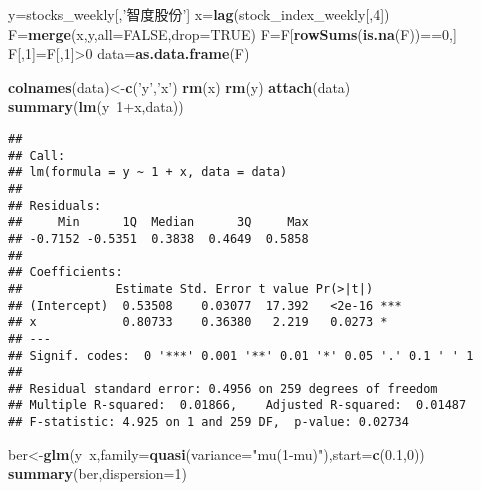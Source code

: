 \documentclass[]{ctexart}
\newenvironment{Shaded}{\begin{snugshade}}{\end{snugshade}}
\newcommand{\KeywordTok}[1]{\textcolor[rgb]{0.13,0.29,0.53}{\textbf{{#1}}}}
\newcommand{\DataTypeTok}[1]{\textcolor[rgb]{0.13,0.29,0.53}{{#1}}}
\newcommand{\DecValTok}[1]{\textcolor[rgb]{0.00,0.00,0.81}{{#1}}}
\newcommand{\FloatTok}[1]{\textcolor[rgb]{0.00,0.00,0.81}{{#1}}}
\newcommand{\StringTok}[1]{\textcolor[rgb]{0.31,0.60,0.02}{{#1}}}
\newcommand{\OtherTok}[1]{\textcolor[rgb]{0.56,0.35,0.01}{{#1}}}
\newcommand{\NormalTok}[1]{{#1}}
\begin{document}
\begin{Shaded}
\begin{Highlighting}[]
\NormalTok{y=stocks_weekly[,}\StringTok{'智度股份'}\NormalTok{]}
\NormalTok{x=}\KeywordTok{lag}\NormalTok{(stock_index_weekly[,}\DecValTok{4}\NormalTok{])}
\NormalTok{F=}\KeywordTok{merge}\NormalTok{(x,y,}\DataTypeTok{all=}\OtherTok{FALSE}\NormalTok{,}\DataTypeTok{drop=}\OtherTok{TRUE}\NormalTok{)}
\NormalTok{F=F[}\KeywordTok{rowSums}\NormalTok{(}\KeywordTok{is.na}\NormalTok{(F))==}\DecValTok{0}\NormalTok{,]}
\NormalTok{F[,}\DecValTok{1}\NormalTok{]=F[,}\DecValTok{1}\NormalTok{]>}\DecValTok{0}
\NormalTok{data=}\KeywordTok{as.data.frame}\NormalTok{(F)}

\KeywordTok{colnames}\NormalTok{(data)<-}\KeywordTok{c}\NormalTok{(}\StringTok{'y'}\NormalTok{,}\StringTok{'x'}\NormalTok{)}
\KeywordTok{rm}\NormalTok{(x)}
\KeywordTok{rm}\NormalTok{(y)}
\KeywordTok{attach}\NormalTok{(data)}
\KeywordTok{summary}\NormalTok{(}\KeywordTok{lm}\NormalTok{(y~}\DecValTok{1}\NormalTok{+x,data))}
\end{Highlighting}
\end{Shaded}

\begin{verbatim}
## 
## Call:
## lm(formula = y ~ 1 + x, data = data)
## 
## Residuals:
##     Min      1Q  Median      3Q     Max 
## -0.7152 -0.5351  0.3838  0.4649  0.5858 
## 
## Coefficients:
##             Estimate Std. Error t value Pr(>|t|)    
## (Intercept)  0.53508    0.03077  17.392   <2e-16 ***
## x            0.80733    0.36380   2.219   0.0273 *  
## ---
## Signif. codes:  0 '***' 0.001 '**' 0.01 '*' 0.05 '.' 0.1 ' ' 1
## 
## Residual standard error: 0.4956 on 259 degrees of freedom
## Multiple R-squared:  0.01866,    Adjusted R-squared:  0.01487 
## F-statistic: 4.925 on 1 and 259 DF,  p-value: 0.02734
\end{verbatim}

\begin{Shaded}
\begin{Highlighting}[]
\NormalTok{ber<-}\KeywordTok{glm}\NormalTok{(y~x,}\DataTypeTok{family=}\KeywordTok{quasi}\NormalTok{(}\DataTypeTok{variance=}\StringTok{"mu(1-mu)"}\NormalTok{),}\DataTypeTok{start=}\KeywordTok{c}\NormalTok{(}\FloatTok{0.1}\NormalTok{,}\DecValTok{0}\NormalTok{))}
\KeywordTok{summary}\NormalTok{(ber,}\DataTypeTok{dispersion=}\DecValTok{1}\NormalTok{)}
\end{Highlighting}
\end{Shaded}
\end{document}
